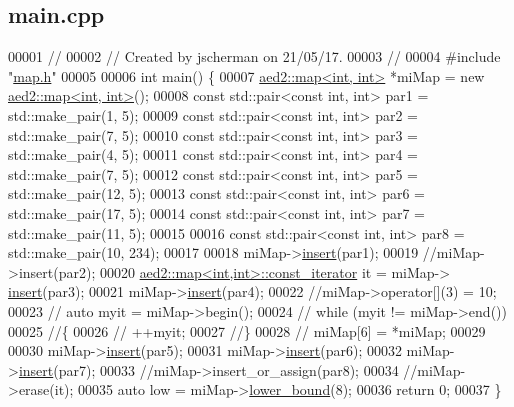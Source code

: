 \hypertarget{main_8cpp_source}{}\subsection{main.\+cpp}

\begin{DoxyCode}
00001 \textcolor{comment}{//}
00002 \textcolor{comment}{// Created by jscherman on 21/05/17.}
00003 \textcolor{comment}{//}
00004 \textcolor{preprocessor}{#include "\hyperlink{map_8h}{map.h}"}
00005 
00006 \textcolor{keywordtype}{int} main() \{
00007     \hyperlink{classaed2_1_1map}{aed2::map<int, int>} *miMap = \textcolor{keyword}{new} \hyperlink{classaed2_1_1map}{aed2::map<int, int>}();
00008     \textcolor{keyword}{const} std::pair<const int, int> par1 = std::make\_pair(1, 5);
00009     \textcolor{keyword}{const} std::pair<const int, int> par2 = std::make\_pair(7, 5);
00010     \textcolor{keyword}{const} std::pair<const int, int> par3 = std::make\_pair(4, 5);
00011     \textcolor{keyword}{const} std::pair<const int, int> par4 = std::make\_pair(7, 5);
00012     \textcolor{keyword}{const} std::pair<const int, int> par5 = std::make\_pair(12, 5);
00013     \textcolor{keyword}{const} std::pair<const int, int> par6 = std::make\_pair(17, 5);
00014     \textcolor{keyword}{const} std::pair<const int, int> par7 = std::make\_pair(11, 5);
00015 
00016     \textcolor{keyword}{const} std::pair<const int, int> par8 = std::make\_pair(10, 234);
00017 
00018     miMap->\hyperlink{classaed2_1_1map_a6941cde9a79c27f054b5c97a587a1854_a6941cde9a79c27f054b5c97a587a1854}{insert}(par1);
00019     \textcolor{comment}{//miMap->insert(par2);}
00020     \hyperlink{classaed2_1_1map_1_1const__iterator}{aed2::map<int,int>::const\_iterator} it = miMap->
      \hyperlink{classaed2_1_1map_a6941cde9a79c27f054b5c97a587a1854_a6941cde9a79c27f054b5c97a587a1854}{insert}(par3);
00021     miMap->\hyperlink{classaed2_1_1map_a6941cde9a79c27f054b5c97a587a1854_a6941cde9a79c27f054b5c97a587a1854}{insert}(par4);
00022     \textcolor{comment}{//miMap->operator[](3) = 10;}
00023    \textcolor{comment}{// auto myit = miMap->begin();}
00024    \textcolor{comment}{// while (myit != miMap->end())}
00025     \textcolor{comment}{//\{}
00026     \textcolor{comment}{//    ++myit;}
00027     \textcolor{comment}{//\}}
00028    \textcolor{comment}{// miMap[6] = *miMap;}
00029 
00030     miMap->\hyperlink{classaed2_1_1map_a6941cde9a79c27f054b5c97a587a1854_a6941cde9a79c27f054b5c97a587a1854}{insert}(par5);
00031     miMap->\hyperlink{classaed2_1_1map_a6941cde9a79c27f054b5c97a587a1854_a6941cde9a79c27f054b5c97a587a1854}{insert}(par6);
00032     miMap->\hyperlink{classaed2_1_1map_a6941cde9a79c27f054b5c97a587a1854_a6941cde9a79c27f054b5c97a587a1854}{insert}(par7);
00033     \textcolor{comment}{//miMap->insert\_or\_assign(par8);}
00034     \textcolor{comment}{//miMap->erase(it);}
00035     \textcolor{keyword}{auto} low = miMap->\hyperlink{classaed2_1_1map_a3399d36fdd5a880b494f3a5795d3f18f_a3399d36fdd5a880b494f3a5795d3f18f}{lower\_bound}(8);
00036     \textcolor{keywordflow}{return} 0;
00037 \}
\end{DoxyCode}
